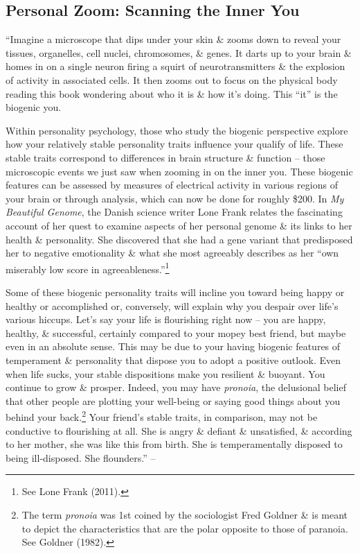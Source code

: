 \documentclass{article}
\numberwithin{equation}{section}
\begin{document}
\subsection{Personal Zoom: Scanning the Inner You}
``Imagine a microscope that dips under your skin \& zooms down to reveal your tissues, organelles, cell nuclei, chromosomes, \& genes. It darts up to your brain \& homes in on a single neuron firing a squirt of neurotransmitters \& the explosion of activity in associated cells. It then zooms out to focus on the physical body reading this book wondering about who it is \& how it's doing. This ``it'' is the biogenic you.

Within personality psychology, those who study the biogenic perspective explore how your relatively stable personality traits influence your qualify of life. These stable traits correspond to differences in brain structure \& function -- those microscopic events we just saw when zooming in on the inner you. These biogenic features can be assessed by measures of electrical activity in various regions of your brain or through analysis, which can now be done for roughly \$200. In \textit{My Beautiful Genome}, the Danish science writer Lone Frank relates the fascinating account of her quest to examine aspects of her personal genome \& its links to her health \& personality. She discovered that she had a gene variant that predisposed her to negative emotionality \& what she most agreeably describes as her ``own miserably low score in agreeableness.''\footnote{See Lone Frank (2011).}

Some of these biogenic personality traits will incline you toward being happy or healthy or accomplished or, conversely, will explain why you despair over life's various hiccups. Let's say your life is flourishing right now -- you are happy, healthy, \& successful, certainly compared to your mopey best friend, but maybe even in an absolute sense. This may be due to your having biogenic features of temperament \& personality that dispose you to adopt a positive outlook. Even when life sucks, your stable dispositions make you resilient \& buoyant. You continue to grow \& prosper. Indeed, you may have \textit{pronoia}, the delusional belief that other people are plotting your well-being or saying good things about you behind your back.\footnote{The term \textit{pronoia} was 1st coined by the sociologist Fred Goldner \& is meant to depict the characteristics that are the polar opposite to those of paranoia. See Goldner (1982).} Your friend's stable traits, in comparison, may not be conductive to flourishing at all. She is angry \& defiant \& unsatisfied, \& according to her mother, she was like this from birth. She is temperamentally disposed to being ill-disposed. She flounders.'' -- \cite[pp. 12--14]{Little2017}
\end{document}
